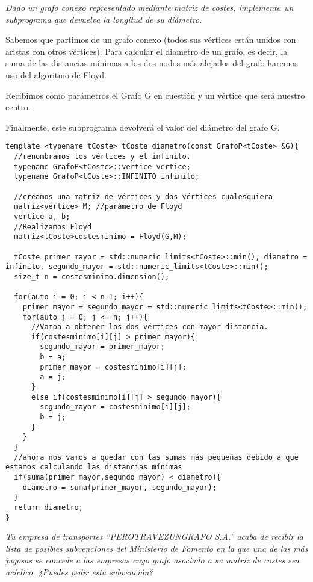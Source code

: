 \textit{Dado un grafo conexo representado mediante matriz de costes, implementa un subprograma que devuelva la longitud de su diámetro.}

Sabemos que partimos de un grafo conexo (todos sus vértices están unidos con aristas con otros vértices).
Para calcular el diametro de un grafo, es decir, la suma de las distancias mínimas a los dos nodos más alejados del grafo haremos uso del algoritmo de Floyd.

Recibimos como parámetros el Grafo G en cuestión y un vértice que será nuestro centro.

Finalmente, este subprograma devolverá el valor del diámetro del grafo G.

\begin{verbatim}
template <typename tCoste> tCoste diametro(const GrafoP<tCoste> &G){
  //renombramos los vértices y el infinito.
  typename GrafoP<tCoste>::vertice vertice;
  typename GrafoP<tCoste>::INFINITO infinito;

  //creamos una matriz de vértices y dos vértices cualesquiera
  matriz<vertice> M; //parámetro de Floyd
  vertice a, b;
  //Realizamos Floyd
  matriz<tCoste>costesminimo = Floyd(G,M);

  tCoste primer_mayor = std::numeric_limits<tCoste>::min(), diametro = infinito, segundo_mayor = std::numeric_limits<tCoste>::min();
  size_t n = costesminimo.dimension();

  for(auto i = 0; i < n-1; i++){
    primer_mayor = segundo_mayor = std::numeric_limits<tCoste>::min();
    for(auto j = 0; j <= n; j++){
      //Vamoa a obtener los dos vértices con mayor distancia.
      if(costesminimo[i][j] > primer_mayor){
        segundo_mayor = primer_mayor;
        b = a;
        primer_mayor = costesminimo[i][j];
        a = j;
      }
      else if(costesminimo[i][j] > segundo_mayor){
        segundo_mayor = costesminimo[i][j];
        b = j;
      }
    }
  }
  //ahora nos vamos a quedar con las sumas más pequeñas debido a que estamos calculando las distancias mínimas
  if(suma(primer_mayor,segundo_mayor) < diametro){
    diametro = suma(primer_mayor, segundo_mayor);
  }
  return diametro;
}
\end{verbatim}

\textbf{\large{}}\textit{ Tu empresa de transportes “PEROTRAVEZUNGRAFO S.A.” acaba de recibir la lista de posibles subvenciones del Ministerio de Fomento en la que una de las más jugosas se concede a las empresas cuyo grafo asociado a su matriz de costes sea acíclico. ¿Puedes pedir esta subvención?}

